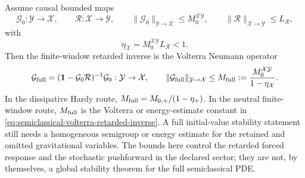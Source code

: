 \begin{controlledapproximation}
Assume causal bounded maps
\[
  \mathcal G_0:\mathcal Y\to\mathcal X,
  \qquad
  \mathcal R:\mathcal X\to\mathcal Y,
  \qquad
  \lVert\mathcal G_0\rVert_{\mathcal Y\to\mathcal X}\le M_0^{\mathcal X\mathcal Y},
  \qquad
  \lVert\mathcal R\rVert_{\mathcal X\to\mathcal Y}\le L_{\mathcal R},
\]
with
\begin{equation}
  \eta_{\mathcal X}
  =
  M_0^{\mathcal X\mathcal Y}L_{\mathcal R}
  <1 .
  \label{eq:semiclassical-volterra-small-gain}
\end{equation}
Then the finite-window retarded inverse is the Volterra Neumann operator
\begin{equation}
  \mathcal G_{\rm full}
  =
  (\mathbf1-\mathcal G_0\mathcal R)^{-1}\mathcal G_0:
  \mathcal Y\to\mathcal X,
  \qquad
  \lVert\mathcal G_{\rm full}\rVert_{\mathcal Y\to\mathcal X}
  \le
  M_{\rm full}
  :=
  \frac{M_0^{\mathcal X\mathcal Y}}{1-\eta_{\mathcal X}} .
  \label{eq:semiclassical-volterra-retarded-inverse}
\end{equation}
In the dissipative Hardy route, \(M_{\rm full}=M_{0,+}/(1-\eta_+)\).  In the
neutral finite-window route, \(M_{\rm full}\) is the Volterra or energy-estimate
constant in \eqref{eq:semiclassical-volterra-retarded-inverse}.  A full
initial-value stability statement still needs a homogeneous semigroup or energy
estimate for the retained and omitted gravitational variables.  The bounds here
control the retarded forced response and the stochastic pushforward in the
declared sector; they are not, by themselves, a global stability theorem for
the full semiclassical PDE.


\end{controlledapproximation}
